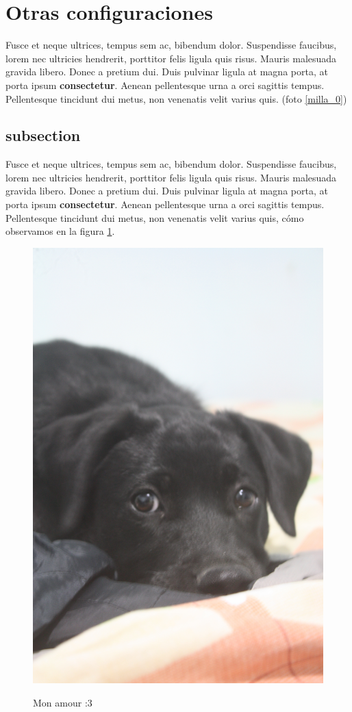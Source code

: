 \documentclass[12pt,letterpaper,oneside]{book}
\begin{document}
\section{Otras configuraciones}

\noindent Fusce et neque ultrices, tempus sem ac, bibendum dolor. Suspendisse faucibus, lorem nec ultricies hendrerit, porttitor felis ligula quis risus. Mauris malesuada gravida libero. Donec a pretium dui. Duis pulvinar ligula at magna porta, at porta ipsum \textbf{consectetur}. Aenean pellentesque urna a orci sagittis tempus. Pellentesque tincidunt dui metus, non venenatis velit varius quis. (foto \ref{milla_0})

\subsection{subsection}
\noindent Fusce et neque ultrices, tempus sem ac, bibendum dolor. Suspendisse faucibus, lorem nec ultricies hendrerit, porttitor felis ligula quis risus. Mauris malesuada gravida libero. Donec a pretium dui. Duis pulvinar ligula at magna porta, at porta ipsum \textbf{consectetur}. Aenean pellentesque urna a orci sagittis tempus. Pellentesque tincidunt dui metus, non venenatis velit varius quis, cómo observamos en la figura \ref{milla_1}.

\begin{figure}[ht]
\centering
\caption{Mon amour :3}
\includegraphics[scale=.06]{img/milla.jpg}
\label{milla_1}
\end{figure}
\end{document}
